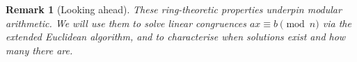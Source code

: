 \documentclass[11pt]{article}
\theoremstyle{defstyle}
\theoremstyle{thmstyle}
\theoremstyle{notstyle}
\newtheorem*{remark}{Remark}
\theoremstyle{cautionstyle}
\begin{document}
\begin{notebox}
\begin{remark}[Looking ahead]
These ring-theoretic properties underpin modular arithmetic.  We will use them to solve linear congruences $ax \equiv b \pmod{n}$ via the extended Euclidean algorithm, and to characterise when solutions exist and how many there are.
\end{remark}
\end{notebox}
\end{document}
